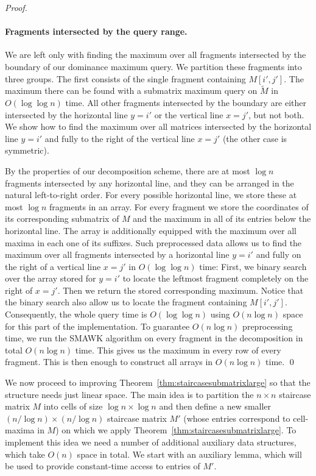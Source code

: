 \documentclass{llncs}
\begin{document}
\begin{proof}
\paragraph{\bf Fragments intersected by the query range.}
We are left only with finding the maximum over all fragments intersected by the boundary of our dominance
maximum query. We partition these fragments into three groups. The first consists of the single fragment
containing $M[i',j']$. The maximum there can be found with a submatrix maximum query
on $\widetilde{M}$ in $O(\log\log n)$ time.
All other fragments intersected by the boundary are either intersected by the horizontal line $y=i'$
or the vertical line $x=j'$, but not both. We show how to find the maximum over all matrices intersected by the horizontal
line $y=i'$ and fully to the right of the vertical line $x=j'$ (the other case is symmetric). 

By the properties of our decomposition
scheme, there are at most $\log n$ fragments intersected by any horizontal line, and
they can be arranged in the natural left-to-right order. For every possible horizontal line,
we store these at most $\log n$ fragments in an array. For every fragment we store the coordinates
of its corresponding submatrix of $M$ and the maximum in all of its entries below the horizontal
line. The array is additionally equipped with the maximum over all maxima in each one of its suffixes.
Such preprocessed data allows us to find the maximum over all fragments intersected by
a horizontal line $y=i'$ and fully on the right of a vertical line $x=j'$ in $O(\log\log n)$ time:
First, we binary search over the array stored for $y=i'$ to locate the leftmost fragment completely on
the right of $x=j'$. Then we return the stored corresponding maximum. Notice that
the binary search also allow us to locate the fragment containing $M[i',j']$. Consequently,
the whole query time is $O(\log\log n)$ using $O(n\log n)$ space for this part
of the implementation. To guarantee $O(n\log n)$ preprocessing time, we  run the 
SMAWK algorithm on every fragment in the decomposition in total $O(n\log n)$ time. This gives us the maximum in every row of every fragment. This is then enough to construct all arrays in $O(n\log n)$ time.
\qed \end{proof}

We now proceed to improving Theorem~\ref{thm:staircasesubmatrixlarge} so that the structure needs just linear space. The main idea
is to partition the $n\times n$ staircase matrix $M$ into cells of size $\log n \times \log n$ and then define a new smaller $(n/\log n) \times (n/\log n)$
staircase matrix $M'$ (whose entries correspond to cell-maxima in $M$) on which we apply Theorem~\ref{thm:staircasesubmatrixlarge}. To implement this idea
we need a number of additional auxiliary data structures, which take $O(n)$ space in total. 
We start with an auxiliary lemma, which will be used to provide constant-time access to entries of $M'$. 
\end{document}
